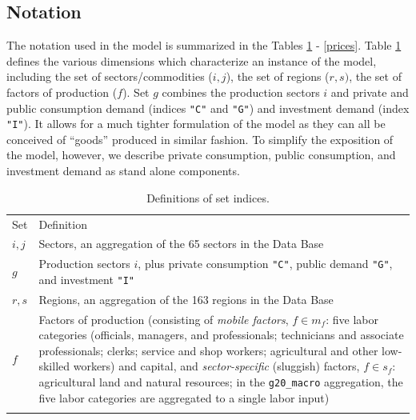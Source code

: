 \subsection{Notation}\label{sets_sec}

The notation used in the model is summarized in the Tables \ref{sets} - \ref{prices}.
Table \ref{sets} defines the various dimensions which characterize an instance of the model, including the set of sectors/commodities ($i,j$), the set of regions ($r,s)$, the set of factors of production ($f$).
Set $g$ combines the production sectors $i$ and private and public consumption demand (indices \texttt{"C"} and \texttt{"G"}) and investment demand (index \texttt{"I"}).
It allows for a much tighter formulation of the model as they can all be conceived of ``goods'' produced in similar fashion.
To simplify the exposition of the model, however, we describe private consumption, public consumption, and investment demand as stand alone components.

\renewcommand{\arraystretch}{1}
\renewcommand{\tabcolsep}{1mm}
\begin{table}[t!]
\begin{center}
\caption{Definitions of set indices.}
\label{sets}
\small
\begin{tabular}{lp{4in}}
\toprule
Set &Definition  \\
\addlinespace
\midrule
\addlinespace
$i,j$ & Sectors, an aggregation of the 65 sectors in the \GTAP 12 Data Base \\
$g$ & Production sectors $i$, plus private consumption \texttt{"C"},
public demand \texttt{"G"}, and investment \texttt{"I"} \\
$r,s$ & Regions, an aggregation of the 163 regions in the \GTAP 12 Data Base\\
$f$ & Factors of production (consisting of
\textit{mobile factors}, $f \in m_f$: five labor categories
(officials, managers, and professionals; technicians and associate
professionals; clerks; service and shop workers; agricultural and other
low-skilled workers) and capital, and \textit{sector-specific} (sluggish)
factors, $f \in s_f$: agricultural land and natural resources; in the
\texttt{g20\_macro} aggregation, the five labor categories are
aggregated to a single labor input)\\ \addlinespace \bottomrule
\end{tabular}
\end{center}
\vspace{0.4in}
\end{table}

